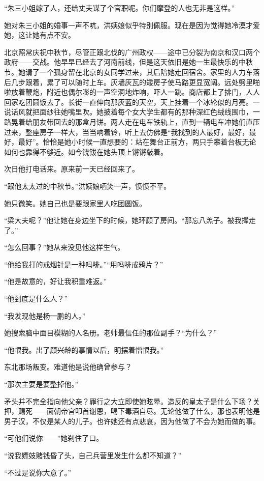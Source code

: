 \par “朱三小姐嫁了人，还给丈夫谋了个官职呢。你们摩登的人也无非是这样。”
\par 她对朱三小姐的婚事一声不吭，洪姨娘似乎特别佩服。现在是因为觉得她冷漠才爱她，这让她有点不安。
\par 北京照常庆祝中秋节，尽管正跟北伐的广州政权——途中已分裂为南京和汉口两个政府——交战。他早早已经去了河南前线，但是这天依旧是她一生最快乐的中秋节。她请了一个孤身留在北京的女同学过来，其后陪她走回宿舍。家里的人力车落后几步跟着，累了可以随时上车。灰墙灰瓦的矮房子使马路更显宽阔。远处劈里啪啦放着鞭炮，附近也偶尔嘭的一声空洞地炸响，吓人一跳。商店都上了排门，人人回家吃团圆饭去了。长街一直伸向那灰蓝的天空，天上挂着一个冰轮似的月亮。一说话风就把面纱往她嘴里吹。她披着每个女大学生都有的那种深红色绒线围巾，一路晃着给朋友带回去的那盒月饼。两人走在电车铁轨上，直到一辆电车冲她们直压过来，整座房子一样大，当当响着铃，听上去仿佛是“我找到的人最好，最好，最好，最好”。恰恰是她小时候一直想要的：站在舞台正前方，两只手攀着台板无论如何也靠得不够近。如今铙钹在她头顶上锵锵敲着。
\par 次日他打电话来。原来前一天已经回来了。
\par “跟他太太过的中秋节。”洪姨娘哂笑一声，愤愤不平。
\par 她只微笑。她自己也是要跟家里人吃团圆饭。
\par “梁大夫呢？”他让她在身边坐下的时候，她环顾了房间。“那忘八羔子。被我撵走了。”
\par “怎么回事？”她从来没见他这样生气。
\par “他给我打的戒烟针是一种吗啡。”“用吗啡戒鸦片？”
\par “他是故意的，好让我积重难返。”
\par “他到底是什么人？”
\par “我发现他是杨一鹏的人。”
\par 她搜索脑中面目模糊的人名册。老帅最信任的那位副手？“为什么？”
\par “他恨我。出了顾兴龄的事情以后，明摆着憎恨我。”
\par 东北那场叛变。难道他是说他确曾参与？
\par “那次主要是要整掉他。”
\par 矛头并不完全指向他父亲？罪行之大立即使她眩晕。造反的皇太子是什么下场？关押，赐死——面朝帝宫叩首谢恩，喝下毒酒自尽。无论他做了什么，那也表明他是男子汉，不仅是某人的儿子。也许她还有点悲哀，因为他做了不会为她而做的事。
\par “可他们说你——”她刹住了口。
\par “说我嫖妓赌钱昏了头，自己兵营里发生什么都不知道？”
\par “不过是说你大意了。”
